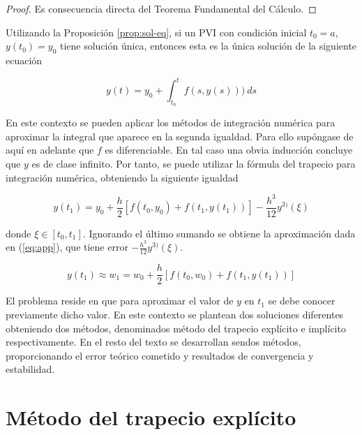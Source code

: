 \documentclass{article}
\theoremstyle{theorem-style}  %
\theoremstyle{definition-style}
\theoremstyle{example-style}
\begin{document}
	\begin{proof}
		Es consecuencia directa del Teorema Fundamental del Cálculo.
	\end{proof}


	Utilizando la Proposición \ref{prop:sol-eq}, si un PVI con condición inicial $t_0 = a$, $y(t_0) = y_0$ tiene solución única, entonces esta es la única solución de la siguiente ecuación

	\begin{equation}
		y(t)  = y_0 + \int_{t_0}^{t} f(s,y(s))) \ ds
	\end{equation}

	En este contexto se pueden aplicar los métodos de integración numérica para aproximar la integral que aparece en la segunda igualdad. Para ello supóngase de aquí en adelante que $f$ es diferenciable. En tal caso una obvia inducción concluye que $y$ es de clase infinito. Por tanto, se puede utilizar la fórmula del trapecio para integración numérica, obteniendo la siguiente igualdad

	\begin{equation} \label{eq:trapecio-igualdad}
		y(t_{1}) = y_0 + \frac{h}{2} \left[f(t_0,y_0) + f(t_1, y(t_1))\right] - \frac{h^3}{12}y^{3)}(\xi)
	\end{equation}


	donde $\xi \in [t_0, t_1]$. Ignorando el último sumando se obtiene la aproximación dada en (\ref{eq:app}), que tiene error $- \frac{h^3}{12}y^{3)}(\xi)$.

	\begin{equation} \label{eq:app}
		y(t_1) \approx w_1 = w_0 + \frac{h}{2} \left[f(t_0,w_0) + f(t_1, y(t_1))\right]
	\end{equation}

	El problema reside en que para aproximar el valor de $y$ en $t_1$ se debe conocer previamente dicho valor. En este contexto se plantean dos soluciones diferentes obteniendo dos métodos, denominados método del trapecio explícito e implícito respectivamente. En el resto del texto se desarrollan sendos métodos, proporcionando el error teórico cometido y resultados de convergencia y estabilidad.


\section{Método del trapecio explícito}	 \label{sec:trapecio-explicito}
\end{document}
